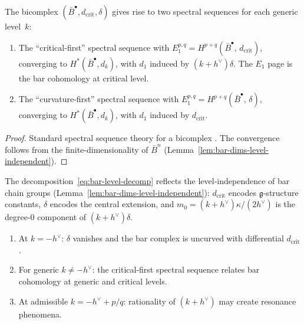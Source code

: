 \begin{corollary}
\label{cor:critical-level-spectral}
The bicomplex $(\bar{B}^\bullet, d_{\mathrm{crit}}, \delta)$ gives
rise to two spectral sequences for each generic level~$k$:
\begin{enumerate}[label=\textup{(\roman*)}]
\item The ``critical-first'' spectral sequence with
$E_1^{p,q} = H^{p+q}(\bar{B}^\bullet,\, d_{\mathrm{crit}})$,
converging to $H^*(\bar{B}^\bullet, d_k)$, with $d_1$ induced
by $(k + h^\vee)\delta$.  The $E_1$ page is the bar cohomology at
critical level.
\item The ``curvature-first'' spectral sequence with
$E_1^{p,q} = H^{p+q}(\bar{B}^\bullet,\, \delta)$,
converging to $H^*(\bar{B}^\bullet, d_k)$, with $d_1$ induced
by $d_{\mathrm{crit}}$.
\end{enumerate}
\end{corollary}

\begin{proof}
Standard spectral sequence theory for a bicomplex
\cite[Ch.~5]{Weibel94}.  The convergence follows from
the finite-dimensionality of $\bar{B}^n$ (Lemma~\ref{lem:bar-dims-level-independent}).
\end{proof}

\begin{remark}
\label{rem:bicomplex-interpretation}
The decomposition~\eqref{eq:bar-level-decomp} reflects the level-independence of bar chain groups (Lemma~\ref{lem:bar-dims-level-independent}): $d_{\mathrm{crit}}$ encodes $\mathfrak{g}$-structure constants, $\delta$ encodes the central extension, and $m_0 = (k+h^\vee)\kappa/(2h^\vee)$ is the degree-$0$ component of $(k + h^\vee)\delta$.
\begin{enumerate}[label=\textup{(\roman*)}]
\item At $k = -h^\vee$: $\delta$ vanishes and the bar complex is uncurved with differential $d_{\mathrm{crit}}$.
\item For generic $k \neq -h^\vee$: the critical-first spectral sequence relates bar cohomology at generic and critical levels.
\item At admissible $k = -h^\vee + p/q$: rationality of $(k + h^\vee)$ may create resonance phenomena.
\end{enumerate}
\end{remark}

